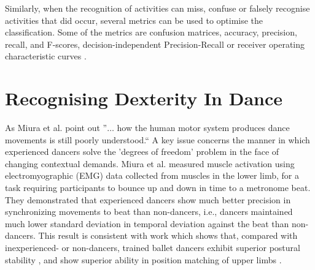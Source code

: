 \documentclass[10pt,journal,compsoc]{IEEEtran}
\begin{document}
Similarly, when the recognition of activities can miss, confuse or falsely
recognise activities that did occur, several metrics
can be used to optimise the classification. Some of the metrics
are confusion matrices, accuracy, precision, recall, and F-scores,
decision-independent Precision-Recall or receiver operating characteristic
curves \cite{bulling2014}.



% 
% 
% 
% 
% 






\section{Recognising Dexterity In Dance }
As Miura et al. \cite{Miura2015} point out ''$\ldots$ how the human motor system produces 
dance movements is still poorly understood.`` A key issue concerns the manner in which experienced 
dancers solve the 'degrees of freedom' problem in the face of changing contextual demands.  
Miura et al. \cite{Miura2013} measured muscle activation using electromyographic (EMG) data collected 
from muscles in the lower limb, for a task requiring participants to 
bounce up and down in time to a metronome beat.  
They demonstrated that experienced dancers show much better precision in synchronizing 
movements to beat than non-dancers, i.e., dancers maintained much lower standard 
deviation in temporal deviation against the beat than non-dancers. 
This result is consistent with work which shows that, compared with inexperienced- or 
non-dancers, trained ballet dancers exhibit superior postural 
stability \cite{Crotts1996}, and show superior ability in position matching 
of upper limbs \cite{Ramsay2001}.
\end{document}
